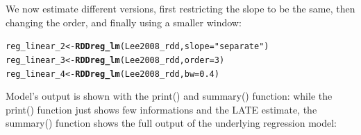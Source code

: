 \documentclass[english,nojss]{jss}\usepackage{graphicx, color}
\makeatletter
\newcommand{\hlfunctioncall}[1]{\textcolor[rgb]{0.501960784313725,0,0.329411764705882}{\textbf{#1}}}%
\newcommand{\hlstring}[1]{\textcolor[rgb]{0.6,0.6,1}{#1}}%
\newenvironment{kframe}{%
 \def\at@end@of@kframe{}%
 \ifinner\ifhmode%
  \def\at@end@of@kframe{\end{minipage}}%
  \begin{minipage}{\columnwidth}%
 \fi\fi%
 \def\FrameCommand##1{\hskip\@totalleftmargin \hskip-\fboxsep
 \colorbox{shadecolor}{##1}\hskip-\fboxsep
     \hskip-\linewidth \hskip-\@totalleftmargin \hskip\columnwidth}%
 \MakeFramed {\advance\hsize-\width
   \@totalleftmargin\z@ \linewidth\hsize
   \@setminipage}}%
 {\par\unskip\endMakeFramed%
 \at@end@of@kframe}
\newenvironment{knitrout}{}{} %
\makeatother
\begin{document}
We now estimate different versions, first restricting the slope to
be the same, then changing the order, and finally using a smaller
window:

\begin{knitrout}
\color{fgcolor}\begin{kframe}
\begin{alltt}
reg_linear_2 <- \hlfunctioncall{RDDreg_lm}(Lee2008_rdd, slope = \hlstring{"separate"})
reg_linear_3 <- \hlfunctioncall{RDDreg_lm}(Lee2008_rdd, order = 3)
reg_linear_4 <- \hlfunctioncall{RDDreg_lm}(Lee2008_rdd, bw = 0.4)
\end{alltt}
\end{kframe}
\end{knitrout}


Model's output is shown with the print() and summary() function: while
the print() function just shows few informations and the LATE estimate,
the summary() function shows the full output of the underlying regression
model:
\end{document}
